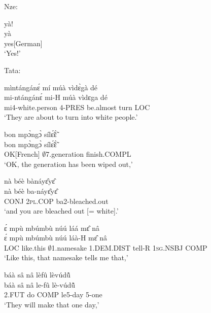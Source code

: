 \noindent Nze: 
\begin{exe} 
\exN\label{181}
  \glll yà! \\
         yà \\
        yes[German] \\
    \trans `Yes!'
\end{exe}

\noindent Tata:

\begin{exe} 
\exN\label{182}
  \glll mìntángánɛ́ mí múà vìdɛ̀gà dé \\
       mi-ntángánɛ́ mi-H múà vìdɛga dé \\
       mi4-white.person 4-PRES be.almost turn LOC  \\
    \trans `They are about to turn into white people.'
\end{exe}

\begin{exe} 
\exN\label{183}
  \glll bon mpɔ̀ngɔ̀ sílɛ̃́ɛ̃̀ \\
        bon mpɔ̀ngɔ̀ sílɛ̃́ɛ̃̀ \\
      OK[French] $\emptyset$7.generation finish.COMPL \\
    \trans `OK, the generation has been wiped out,'
\end{exe}

\begin{exe} 
\exN\label{184}
  \glll nà béè bànáyɛ̂yɛ̂ \\
         nà béè ba-náyɛ̂yɛ̂ \\
        CONJ 2\textsc{pl}.COP ba2-bleached.out  \\
    \trans `and you are bleached out [= white].'
\end{exe}

\begin{exe} 
\exN\label{185}
  \glll ɛ́ mpù mbúmbù núú láá mɛ̂ nâ \\
        ɛ́ mpù mbúmbù núú láà-H mɛ̂ nâ \\
        LOC like.this $\emptyset$1.namesake 1.DEM.DIST tell-R 1\textsc{sg}.NSBJ COMP \\
    \trans `Like this, that namesake tells me that,'
\end{exe}

\begin{exe} 
\exN\label{186}
  \glll báà sâ nâ lèfû lèvúdũ̂ \\
          báà sâ nâ le-fû lè-vúdũ̂ \\
       2.FUT do COMP le5-day 5-one  \\
    \trans `They will make that one day,'
\end{exe}


